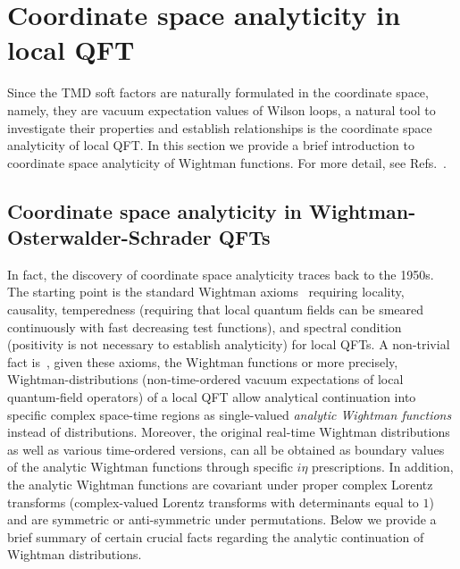 \documentclass[a4paper,11pt]{article}
\begin{document}
\section{Coordinate space analyticity in local QFT}\label{sec:Analy}
Since the TMD soft factors are naturally formulated in the coordinate space, namely, they are vacuum expectation values of Wilson loops, a natural tool to investigate their properties and establish relationships is the coordinate space analyticity of local QFT. In this section we provide a brief introduction to coordinate space analyticity of Wightman functions. For more detail, see Refs.~\cite{Streater:1989vi,Jost:1965yxu}. 

\subsection{Coordinate space analyticity in Wightman-Osterwalder-Schrader QFTs }
In fact, the discovery of coordinate space analyticity traces back to the 1950s. The starting point is the standard Wightman axioms~\cite{Streater:1989vi,Jost:1965yxu} requiring locality, causality, temperedness (requiring that local quantum fields can be smeared continuously with fast decreasing test functions), and spectral condition (positivity is not necessary to establish analyticity) for local QFTs. A non-trivial fact is~\cite{Streater:1989vi,Jost:1965yxu}, given these axioms, the Wightman functions or more precisely, Wightman-distributions (non-time-ordered vacuum expectations of local quantum-field operators) of a local QFT allow analytical continuation into specific
complex space-time regions as single-valued {\it analytic Wightman functions} instead of distributions. Moreover, the original real-time Wightman distributions as well as various time-ordered versions,  can all be obtained as boundary values of the analytic Wightman functions through specific $i\eta$ prescriptions. In addition, the analytic Wightman functions are covariant under proper {complex Lorentz transforms} (complex-valued Lorentz transforms with determinants equal to $1$)  and are symmetric or anti-symmetric under permutations. Below we provide a brief summary of certain crucial facts regarding the analytic continuation of Wightman distributions. 
\end{document}
